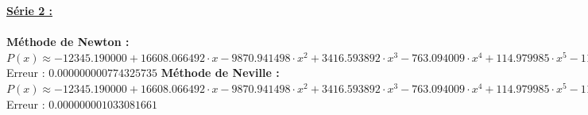 \documentclass{report}
\begin{document}
	\noindent\underline{\textbf{Série 2 :}} \\ \\
	\textbf{Méthode de Newton :}\\
	$P(x) \approx -12345.190000 + 16608.066492 \cdot x- 9870.941498 \cdot x^{2}  + 3416.593892 \cdot x^{3} - 763.094009 \cdot x^{4}  + 114.979985 \cdot x^{5} - 11.842442 \cdot x^{6}  + 0.823658 \cdot x^{7} - 0.037039 \cdot x^{8}  + 0.000973 \cdot x^{9} - 0.000011 \cdot x^{10} $\\
	Erreur : $0.000000000774325735$
	\newline
	\newline
	\textbf{Méthode de Neville :}\\
	$P(x) \approx -12345.190000 + 16608.066492 \cdot x- 9870.941498 \cdot x^{2}  + 3416.593892 \cdot x^{3} - 763.094009 \cdot x^{4}  + 114.979985 \cdot x^{5} - 11.842442 \cdot x^{6}  + 0.823658 \cdot x^{7} - 0.037039 \cdot x^{8}  + 0.000973 \cdot x^{9} - 0.000011 \cdot x^{10} $\\
	Erreur : $0.000000001033081661$
	\newline
	\newline
	
\end{document}
